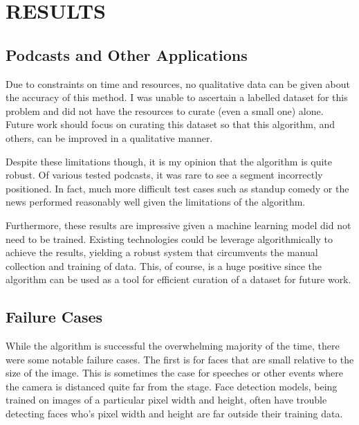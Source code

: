 \documentclass{article}
\begin{document}
\section{RESULTS}
\label{sec:majhead}

\subsection{Podcasts and Other Applications}
\label{ssec:podcasts-and-other-applications}

Due to constraints on time and resources, no qualitative data can be given about the accuracy of this method. I was unable to ascertain a labelled dataset for this problem and did not have the resources to curate (even a small one) alone. Future work should focus on curating this dataset so that this algorithm, and others, can be improved in a qualitative manner.

Despite these limitations though, it is my opinion that the algorithm is quite robust. Of various tested podcasts, it was rare to see a segment incorrectly positioned. In fact, much more difficult test cases such as standup comedy or the news performed reasonably well given the limitations of the algorithm.

Furthermore, these results are impressive given a machine learning model did not need to be trained. Existing technologies could be leverage algorithmically to achieve the results, yielding a robust system that circumvents the manual collection and training of data. This, of course, is a huge positive since the algorithm can be used as a tool for efficient curation of a dataset for future work.

\subsection{Failure Cases}
\label{ssec:failure-cases}

While the algorithm is successful the overwhelming majority of the time, there were some notable failure cases. The first is for faces that are small relative to the size of the image. This is sometimes the case for speeches or other events where the camera is distanced quite far from the stage. Face detection models, being trained on images of a particular pixel width and height, often have trouble detecting faces who's pixel width and height are far outside their training data.
\end{document}
